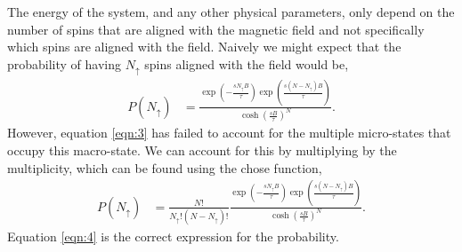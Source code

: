 \documentclass[a4paper]{article}
\begin{document}
\begin{multicols}{2}
        The energy of the system, and any other physical %
        parameters, only depend on the number of spins that are %
        aligned with the magnetic field and not specifically %
        which spins are aligned with the field. Naively we might %
        expect that the probability of having \(N_{\uparrow}\) %
        spins aligned with the field would be,
        \begin{align}
            P(N_{\uparrow}) &= \frac{
                    \exp\left(-\frac{sN_{\uparrow}B}{\tau}\right)
                    \exp\left(\frac{s(N - N_{\uparrow})B}{\tau}\right)}{
                    \cosh\left(\frac{sB}{\tau}\right)^{N}}.
            \label{eqn:3}
        \end{align}
        However, equation \ref{eqn:3} has failed to account for the %
        multiple micro-states that occupy this macro-state. We can %
        account for this by multiplying by the multiplicity, which %
        can be found using the chose function,
        \begin{align}
            P(N_{\uparrow}) &= \frac{N!}{N_{\uparrow}!(N - N_{\uparrow})!}
                    \frac{\exp\left(-\frac{sN_{\uparrow}B}{\tau}\right)
                    \exp\left(\frac{s(N - N_{\uparrow})B}{\tau}\right)}{
                    \cosh\left(\frac{sB}{\tau}\right)^{N}}.
            \label{eqn:4}
        \end{align}
        Equation \ref{eqn:4} is the correct expression for the probability.



\end{multicols}
\end{document}
